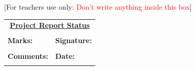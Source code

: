 \begin{titlepage}
\makeatother
{\large [For teachers use only: \textcolor{red}{Don’t write anything inside this box}]}\\

\begin{table}[]
\centering
\begin{tabular}{|p{7.5cm}p{7.0cm}|}
\hline
\multicolumn{2}{|c|}{{\underline{\textbf{Project Report Status}}}} \\
 & \\\hline
\textbf{Marks:}                & \textbf{Signature:}        \\
 & \\ 
\textbf{Comments:}             & \textbf{Date:}             \\ 
 & \\\hline
\end{tabular}
\end{table}


\end{titlepage}

